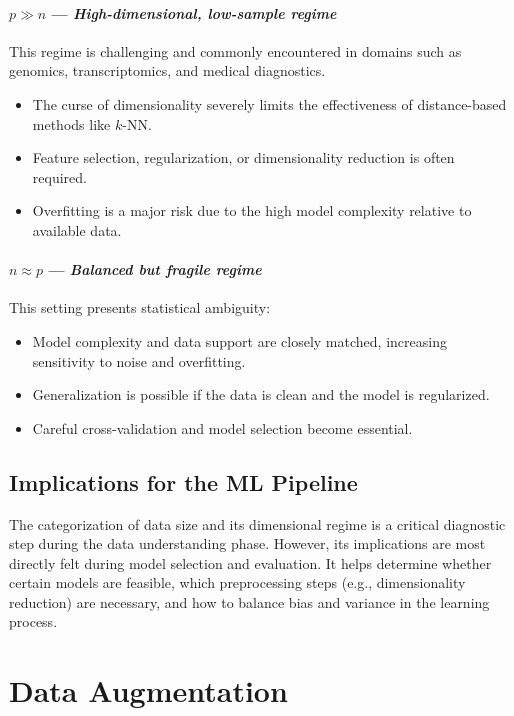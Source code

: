\documentclass[12pt,openany]{book}
\begin{document}
\paragraph{\(p \gg n\) --- \textit{High-dimensional, low-sample regime}}
This regime is challenging and commonly encountered in domains such as genomics, transcriptomics, and medical diagnostics.
\begin{itemize}
    \item The curse of dimensionality severely limits the effectiveness of distance-based methods like \(k\)-NN.
    \item Feature selection, regularization, or dimensionality reduction is often required.
    \item Overfitting is a major risk due to the high model complexity relative to available data.
\end{itemize}

\paragraph{\(n \approx p\) --- \textit{Balanced but fragile regime}}
This setting presents statistical ambiguity:
\begin{itemize}
    \item Model complexity and data support are closely matched, increasing sensitivity to noise and overfitting.
    \item Generalization is possible if the data is clean and the model is regularized.
    \item Careful cross-validation and model selection become essential.
\end{itemize}

\subsection{Implications for the ML Pipeline}

The categorization of data size and its dimensional regime is a critical diagnostic step during the data understanding phase. However, its implications are most directly felt during model selection and evaluation. It helps determine whether certain models are feasible, which preprocessing steps (e.g., dimensionality reduction) are necessary, and how to balance bias and variance in the learning process.



\section{Data Augmentation}
\end{document}
